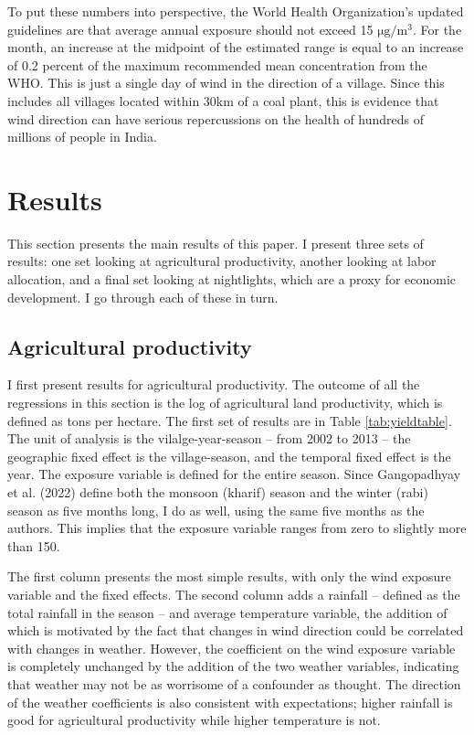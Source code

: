 \documentclass[
]{article}
\begin{document}
To put these numbers into perspective, the World Health Organization's updated guidelines are that average annual exposure should not exceed 15 \(\mathrm{\mu g/m^3}\). For the month, an increase at the midpoint of the estimated range is equal to an increase of 0.2 percent of the maximum recommended mean concentration from the WHO. This is just a single day of wind in the direction of a village. Since this includes all villages located within 30km of a coal plant, this is evidence that wind direction can have serious repercussions on the health of hundreds of millions of people in India.

\hypertarget{results}{%
\section{\texorpdfstring{Results \label{results}}{Results }}\label{results}}

This section presents the main results of this paper. I present three sets of results: one set looking at agricultural productivity, another looking at labor allocation, and a final set looking at nightlights, which are a proxy for economic development. I go through each of these in turn.

\hypertarget{agricultural-productivity}{%
\subsection{Agricultural productivity}\label{agricultural-productivity}}

I first present results for agricultural productivity. The outcome of all the regressions in this section is the log of agricultural land productivity, which is defined as tons per hectare. The first set of results are in Table \ref{tab:yieldtable}. The unit of analysis is the vilalge-year-season -- from 2002 to 2013 -- the geographic fixed effect is the village-season, and the temporal fixed effect is the year. The exposure variable is defined for the entire season. Since Gangopadhyay et al. (2022) define both the monsoon (kharif) season and the winter (rabi) season as five months long, I do as well, using the same five months as the authors. This implies that the exposure variable ranges from zero to slightly more than 150.

The first column presents the most simple results, with only the wind exposure variable and the fixed effects. The second column adds a rainfall -- defined as the total rainfall in the season -- and average temperature variable, the addition of which is motivated by the fact that changes in wind direction could be correlated with changes in weather. However, the coefficient on the wind exposure variable is completely unchanged by the addition of the two weather variables, indicating that weather may not be as worrisome of a confounder as thought. The direction of the weather coefficients is also consistent with expectations; higher rainfall is good for agricultural productivity while higher temperature is not.
\end{document}
